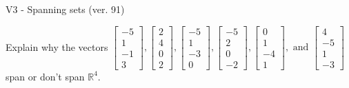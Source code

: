 \begin{exercise}
  \begin{exerciseTitle}V3 - Spanning sets (ver. 91)\end{exerciseTitle}
  \begin{exerciseStatement}
    Explain why the vectors \(\left[\begin{array}{r}
-5 \\
1 \\
-1 \\
3
\end{array}\right] , \left[\begin{array}{r}
2 \\
4 \\
0 \\
2
\end{array}\right] , \left[\begin{array}{r}
-5 \\
1 \\
-3 \\
0
\end{array}\right] , \left[\begin{array}{r}
-5 \\
2 \\
0 \\
-2
\end{array}\right] , \left[\begin{array}{r}
0 \\
1 \\
-4 \\
1
\end{array}\right] , \text{ and } \left[\begin{array}{r}
4 \\
-5 \\
1 \\
-3
\end{array}\right]\) span or don't span \(\mathbb{R}^4\). 
	



\end{exerciseStatement}
\end{exercise}
